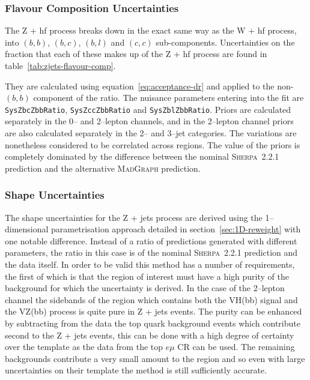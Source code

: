 \subsubsection{Flavour Composition Uncertainties}

The Z + hf process breaks down in the exact same way as the W + hf process, into
$(b,b)$, $(b, c)$, $(b, l)$ and $(c, c)$ sub-components. Uncertainties on the
fraction that each of these makes up of the Z + hf process are found in
table~\ref{tab:zjets-flavour-comp}.

They are calculated using equation~\ref{eq:acceptance-dr} and applied to the
non-$(b, b)$ component of the ratio. The nuisance parameters entering into the
fit are \texttt{SysZbcZbbRatio}, \texttt{SysZccZbbRatio} and
\texttt{SysZblZbbRatio}. Priors are calculated separately in the 0-- and
2--lepton channels, and in the 2--lepton channel priors are also calculated
separately in the 2-- and 3--jet categories. The variations are nonetheless
considered to be correlated across regions. The value of the priors is
completely dominated by the difference between the nominal \textsc{Sherpa}~2.2.1
prediction and the alternative \textsc{MadGraph} prediction.

\subsubsection{Shape Uncertainties}
\label{sec:zjets-shapes}

The shape uncertainties for the Z + jets process are derived using the
1--dimensional parametrisation approach detailed in
section~\ref{sec:1D-reweight} with one notable difference. Instead of a ratio of
predictions generated with different parameters, the ratio in this case is of
the nominal \textsc{Sherpa}~2.2.1 prediction and the data itself. In order to be
valid this method has a number of requirements, the first of which is that the
region of interest must have a high purity of the background for which the
uncertainty is derived. In the case of the 2--lepton channel the sidebands of
the region which contains both the VH(bb) signal and the VZ(bb) process is quite
pure in Z + jets events. The purity can be enhanced by subtracting from the data
the top quark background events which contribute second to the Z + jets events,
this can be done with a high degree of certainty over the template as the data
from the top $e\mu$ CR can be used. The remaining backgrounds contribute a very
small amount to the region and so even with large uncertainties on their
template the method is still sufficiently accurate.

